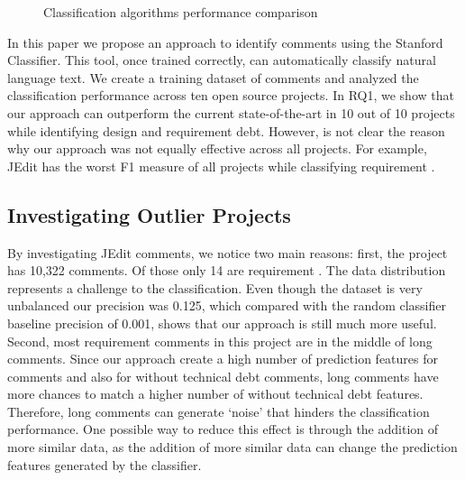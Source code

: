 \begin{figure}[!thb]
  \centering
  \caption{Classification algorithms performance comparison}
  \label{fig:algorithms_comparison}
\end{figure}

In this paper we propose an approach to identify \SATD comments using the Stanford Classifier. This tool, once trained correctly, can automatically classify natural language text. We create a training dataset of \SATD comments and analyzed the classification performance across ten open source projects. In RQ1, we show that our approach can outperform the current state-of-the-art in 10 out of 10 projects while identifying design and requirement debt. However, is not clear the reason why our approach was not equally effective across all projects. For example, JEdit has the worst F1 measure of all projects while classifying requirement \SATD.

\subsection{Investigating Outlier Projects}
By investigating JEdit comments, we notice two main reasons: first, the project has 10,322 comments. Of those only 14 are requirement \SATD. The data distribution represents a challenge to the classification. Even though the dataset is very unbalanced our precision was 0.125, which compared with the random classifier baseline precision of 0.001, shows that our approach is still much more useful. Second, most requirement \SATD comments in this project are in the middle of long comments. Since our approach create a high number of prediction features for \SATD comments and also for without technical debt comments, long comments have more chances to match a higher number of without technical debt features. Therefore, long comments can generate `noise' that hinders the classification performance. One possible way to reduce this effect is through the addition of more similar data, as the addition of more similar data can change the prediction features generated by the classifier. 

